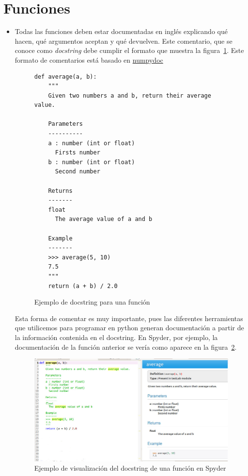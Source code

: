 \documentclass{article}
\begin{document}
\section{Funciones}
\begin{itemize}
\item Todas las funciones deben estar documentadas en inglés explicando qué hacen, qué argumentos aceptan y qué devuelven. Este comentario, que se conoce como \emph {docstring} debe cumplir el formato que muestra la figura~\ref{fig:docstring}. Este formato de comentarios está basado en
\href{https://github.com/numpy/numpy/blob/master/doc/HOWTO_DOCUMENT.rst.txt}{numpydoc}


\begin{figure}
  \centering
 \begin{lstlisting}
def average(a, b):
    """
    Given two numbers a and b, return their average value.

    Parameters
    ----------
    a : number (int or float)
      Firsts number
    b : number (int or float)
      Second number

    Returns
    -------
    float
      The average value of a and b

    Example
    -------
    >>> average(5, 10)
    7.5
    """
    return (a + b) / 2.0
\end{lstlisting}
  \caption{Ejemplo de docstring para una función}
  \label{fig:docstring}
\end{figure}


Esta forma de comentar es muy importante, pues las diferentes herramientas que utilicemos para programar en python generan documentación a partir de la información contenida en el docstring. En Spyder, por ejemplo, la documentación de la función anterior se vería como aparece en la figura~\ref{fig:docstring_spyder}.

\begin{figure}
  \centering
  \includegraphics[scale=0.45]{ejcomment.jpg}
  \caption{Ejemplo de visualización del docstring de una función en Spyder}
  \label{fig:docstring_spyder}
\end{figure}


\end{itemize}
\end{document}
